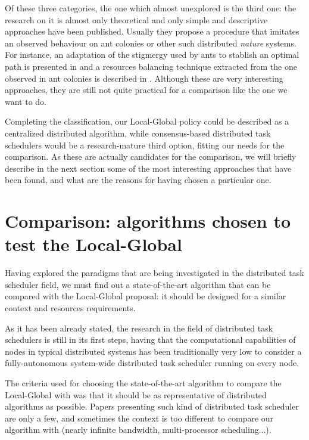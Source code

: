Of these three categories, the one which almost unexplored is the third one: the research on it is almost only theoretical and only simple and descriptive approaches have been published. Usually they propose a procedure that imitates an observed behaviour on ant colonies or other such distributed \emph{nature} systems. For instance, an adaptation of the stigmergy used by ants to stablish an optimal path is presented in \cite{Stigmergy} and a resources balancing technique extracted from the one observed in ant colonies is described in \cite{antcollonies}. Although these are very interesting approaches, they are still not quite practical for a comparison like the one we want to do.

Completing the classification, our Local-Global policy could be described as a centralized distributed algorithm, while consensus-based distributed task schedulers would be a research-mature third option, fitting our needs for the comparison. As these are actually candidates for the comparison, we will briefly describe in the next section some of the most interesting approaches that have been found, and what are the reasons for having chosen a particular one.


\section{Comparison: algorithms chosen to test the Local-Global}

Having explored the paradigms that are being investigated in the distributed task scheduler field, we must find out a state-of-the-art algorithm that can be compared with the Local-Global proposal: it should be designed for a similar context and resources requirements.

As it has been already stated, the research in the field of distributed task schedulers is still in its first steps, having that the computational capabilities of nodes in typical distributed systems has been traditionally very low to consider a fully-autonomous system-wide distributed task scheduler running on every node.

The criteria used for choosing the state-of-the-art algorithm to compare the Local-Global with was that it should be as representative of distributed algorithms as possible. Papers presenting such kind of distributed task scheduler are only a few, and sometimes the context is too different to compare our algorithm with (nearly infinite bandwidth, multi-processor scheduling...).

